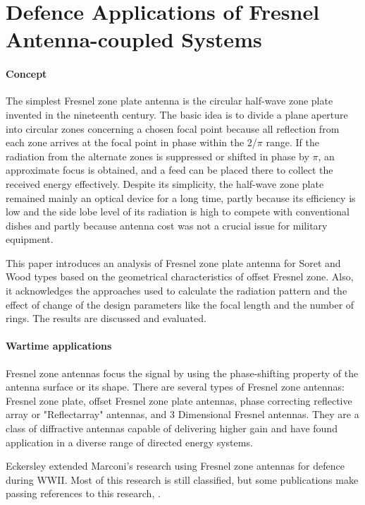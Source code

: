 \documentclass[review]{elsarticle}
\begin{document}
\linenumbers

\section{Defence Applications of Fresnel Antenna-coupled Systems}

\paragraph{Concept} The simplest Fresnel zone plate antenna is the circular half-wave zone plate invented in the nineteenth century. The basic idea is to divide a plane aperture into circular zones concerning a chosen focal point because all reflection from each zone arrives at the focal point in phase within the  2/$\pi$  range. If the radiation from the alternate zones is suppressed or shifted in phase by $\pi$, an approximate focus is obtained, and a feed can be placed there to collect the received energy effectively. Despite its simplicity, the half-wave zone plate remained mainly an optical device for a long time, partly because its efficiency is low and the side lobe level of its radiation is high to compete with conventional dishes and partly because antenna cost was not a crucial issue for military equipment. 

This paper introduces an analysis of Fresnel zone plate antenna for Soret and Wood types based on the geometrical characteristics of offset Fresnel zone. Also, it acknowledges the approaches used to calculate the radiation pattern and the effect of change of the design parameters like the focal length and the number of rings. The results are discussed and evaluated.

\paragraph{Wartime applications} Fresnel zone antennas focus the signal by using the phase-shifting property of the antenna surface or its shape.   There are several types of Fresnel zone antennas: Fresnel zone plate, offset Fresnel zone plate antennas, phase correcting reflective array or "Reflectarray" antennas, and 3 Dimensional Fresnel antennas. They are a class of diffractive antennas capable of delivering higher gain and have found application in a diverse range of directed energy systems.

Eckersley extended Marconi's research using Fresnel zone antennas for defence during WWII. Most of this research is still classified, but some publications make passing references to this research\cite{Eckersley192706}, \cite{Eckersley194007}.   
\end{document}
